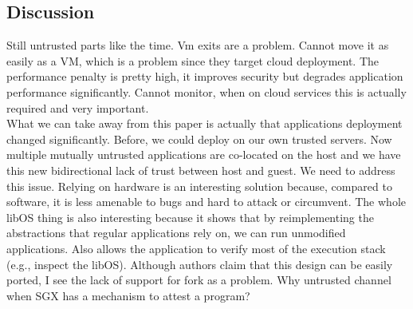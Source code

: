\subsection{Discussion}

Still untrusted parts like the time.
Vm exits are a problem.
Cannot move it as easily as a VM, which is a problem since they target cloud deployment.
The performance penalty is pretty high, it improves security but degrades application performance significantly.
Cannot monitor, when on cloud services this is actually required and very important.\\

What we can take away from this paper is actually that applications deployment changed significantly.
Before, we could deploy on our own trusted servers.
Now multiple mutually untrusted applications are co-located on the host and we have this new bidirectional lack of trust between host and guest.
We need to address this issue.
Relying on hardware is an interesting solution because, compared to software, it is less amenable to bugs and hard to attack or circumvent.
The whole libOS thing is also interesting because it shows that by reimplementing the abstractions that regular applications rely on, we can run unmodified applications.
Also allows the application to verify most of the execution stack (e.g., inspect the libOS).
Although authors claim that this design can be easily ported, I see the lack of support for fork as a problem.
Why untrusted channel when SGX has a mechanism to attest a program?





